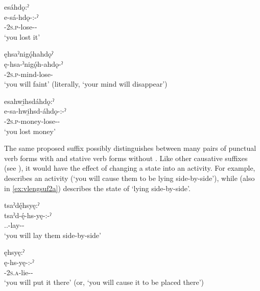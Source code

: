 \ex esáhdǫ:ˀ\\\label{ex:vlengsufb}
\gll e-sá-hdǫ-:-ˀ\\
 {\factual}-\textsc{2s.p}-lose-{\causative}-{\punctual}\\
\glt `you lost it'

\ex ęhsaˀnigǫ́hahdǫˀ\\\label{ex:vlengsufc}
\gll ę-hsa-ˀnigǫ́h-ahdǫ-ˀ\\
\fut-\textsc{2s.p}-mind-lose-{\punctual}\\
\glt ‘you will faint’ (literally, ‘your mind will disappear’)

\ex esahwi̱hsdáhdǫ:ˀ\\\label{ex:vlengsufd}
\gll e-sa-hwi̱hsd-áhdǫ-:-ˀ\\
 {\factual}-\textsc{2s.p}-money-lose-{\causative}-{\punctual}\\
\glt `you lost money'
\z
\z

The same proposed \stem{-:} \textsc{\causative} suffix possibly distinguishes between many pairs of punctual verb forms with \stem{-:} and stative verb forms without \stem{-:} . Like other causative suffixes (see ), it would have the effect of changing a state into an activity. For example,   describes an activity (‘you will cause them to be lying side-by-side’), while  (also in \ref{ex:vlengsuf2a}) describes the state of ‘lying side-by-side’.

\ea\label{ex:vlengsuf2} 
\ea tsaˀdę́hsyę:ˀ\\\label{ex:vlengsuf2a}
\gll tsaˀd-ę́-hs-yę-:-ˀ\\
 {\coincident.\factual.\dualic}-lay-{\causative}-{\punctual}\\
\glt `you will lay them side-by-side'


\ex ęhsyę:ˀ\\
\gll ę-hs-yę-:-ˀ\\
\fut-\textsc{2s.a}-lie-{\causative}-{\punctual}\\
\glt ‘you will put it there’ (or, ‘you will cause it to be placed there’)

